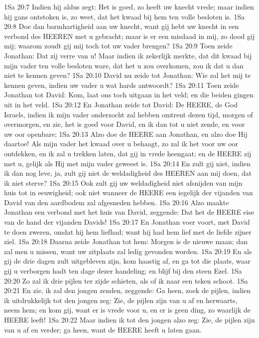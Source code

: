1Sa 20:7  Indien hij aldus zegt: Het is goed, zo heeft uw knecht vrede; maar indien hij gans ontstoken is, zo weet, dat het kwaad bij hem ten volle besloten is.
1Sa 20:8  Doe dan barmhartigheid aan uw knecht, want gij hebt uw knecht in een verbond des HEEREN met u gebracht; maar is er een misdaad in mij, zo dood gij mij; waarom zoudt gij mij toch tot uw vader brengen?
1Sa 20:9  Toen zeide Jonathan: Dat zij verre van u! Maar indien ik zekerlijk merkte, dat dit kwaad bij mijn vader ten volle besloten ware, dat het u zou overkomen, zou ik dat u dan niet te kennen geven?
1Sa 20:10  David nu zeide tot Jonathan: Wie zal het mij te kennen geven, indien uw vader u wat hards antwoordt?
1Sa 20:11  Toen zeide Jonathan tot David: Kom, laat ons toch uitgaan in het veld; en die beiden gingen uit in het veld.
1Sa 20:12  En Jonathan zeide tot David: De HEERE, de God Israels, indien ik mijn vader onderzocht zal hebben omtrent dezen tijd, morgen of overmorgen, en zie, het is goed voor David, en ik dan tot u niet zende, en voor uw oor openbare;
1Sa 20:13  Alzo doe de HEERE aan Jonathan, en alzo doe Hij daartoe! Als mijn vader het kwaad over u behaagt, zo zal ik het voor uw oor ontdekken, en ik zal u trekken laten, dat gij in vrede heengaat; en de HEERE zij met u, gelijk als Hij met mijn vader geweest is.
1Sa 20:14  En zult gij niet, indien ik dan nog leve, ja, zult gij niet de weldadigheid des HEEREN aan mij doen, dat ik niet sterve?
1Sa 20:15  Ook zult gij uw weldadigheid niet afsnijden van mijn huis tot in eeuwigheid; ook niet wanneer de HEERE een iegelijk der vijanden van David van den aardbodem zal afgesneden hebben.
1Sa 20:16  Alzo maakte Jonathan een verbond met het huis van David, zeggende: Dat het de HEERE eise van de hand der vijanden Davids!
1Sa 20:17  En Jonathan voer voort, met David te doen zweren, omdat hij hem liefhad; want hij had hem lief met de liefde zijner ziel.
1Sa 20:18  Daarna zeide Jonathan tot hem: Morgen is de nieuwe maan; dan zal men u missen, want uw zitplaats zal ledig gevonden worden.
1Sa 20:19  En als gij de drie dagen zult uitgebleven zijn, kom haastig af, en ga tot die plaats, waar gij u verborgen hadt ten dage dezer handeling; en blijf bij den steen Ezel.
1Sa 20:20  Zo zal ik drie pijlen ter zijde schieten, als of ik naar een teken schoot.
1Sa 20:21  En zie, ik zal den jongen zenden, zeggende: Ga heen, zoek de pijlen, indien ik uitdrukkelijk tot den jongen zeg: Zie, de pijlen zijn van u af en herwaarts, neem hem; en kom gij, want er is vrede voor u, en er is geen ding, zo waarlijk de HEERE leeft!
1Sa 20:22  Maar indien ik tot den jongen alzo zeg: Zie, de pijlen zijn van u af en verder; ga heen, want de HEERE heeft u laten gaan.

